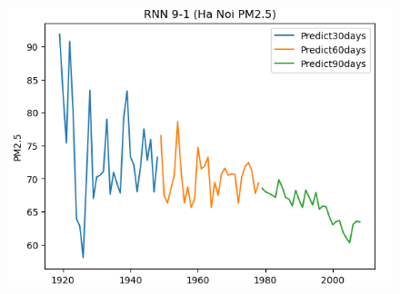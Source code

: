 \begin{figure}[H]
\begin{minipage}{0.15\textwidth}
    \end{minipage}
    \hfill
    \begin{minipage}{0.15\textwidth}
    \centering
    \includegraphics[width=1\textwidth]{img/final/RNN/90D/RNN_9_1_HN_90D.png}
    \end{minipage}
    \hfill


\end{figure}
